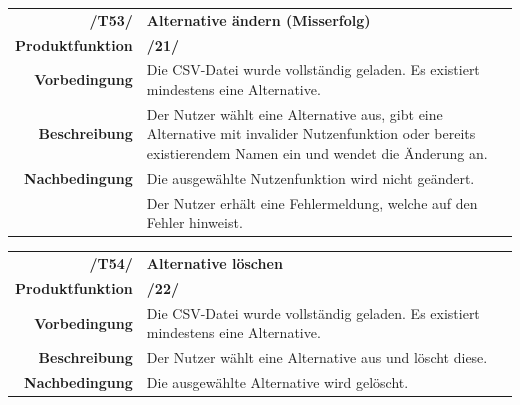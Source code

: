 \documentclass{article}
\begin{document}
\begin{table}[H]
\begin{tabularx}{\textwidth}{rX}
 \vspace{1mm}
\textbf{/T53/}         & \textbf{Alternative ändern (Misserfolg)} \\ \vspace{1mm}
\textbf{Produktfunktion} & \textbf{/21/} \\ \vspace{1mm}
\textbf{Vorbedingung}  & Die CSV-Datei wurde vollständig geladen. Es existiert mindestens eine Alternative.   \\ \vspace{1mm}
\textbf{Beschreibung}  & Der Nutzer wählt eine Alternative aus, gibt eine Alternative mit invalider Nutzenfunktion oder bereits existierendem Namen ein und wendet die Änderung an. \\
\textbf{Nachbedingung} & Die ausgewählte Nutzenfunktion wird nicht geändert. \\ & Der Nutzer erhält eine Fehlermeldung, welche auf den Fehler hinweist.
\end{tabularx}
\end{table}

\begin{table}[H]
\begin{tabularx}{\textwidth}{rX}
 \vspace{1mm}
\textbf{/T54/}         & \textbf{Alternative löschen} \\ \vspace{1mm}
\textbf{Produktfunktion} & \textbf{/22/} \\ \vspace{1mm}
\textbf{Vorbedingung}  & Die CSV-Datei wurde vollständig geladen. Es existiert mindestens eine Alternative.  \\ \vspace{1mm}
\textbf{Beschreibung}  & Der Nutzer wählt eine Alternative aus und löscht diese. \\
\textbf{Nachbedingung} & Die ausgewählte Alternative wird gelöscht.
\end{tabularx}
\end{table}


\end{document}
